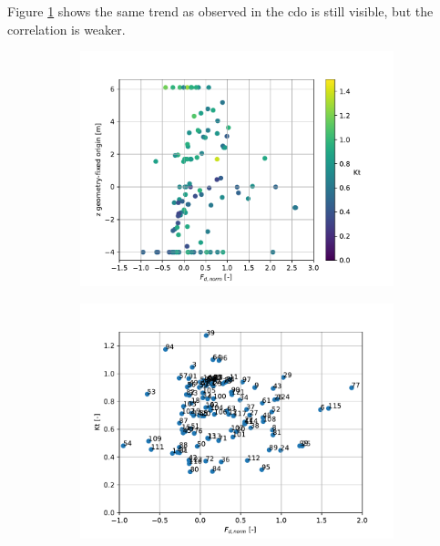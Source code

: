 Figure \ref{fig: Fd_norm_VS_top_bw_with_Kt} shows the same trend as observed in the \acrfull{cdo} is still visible, but the correlation is weaker. 

\begin{figure}[h]
    \centering
    \begin{subfigure}[b]{0.49\textwidth}
        \centering
        \includegraphics[width=\linewidth]{figures/ComFLOW/Results moving/DI1/H9/Fd_norm_VS_top_bw_with_Kt.pdf}
        \caption[]%
        {{\small }}    
        \label{fig: Fd_norm_VS_top_bw_with_Kt}
    \end{subfigure}
    \hfill
    \begin{subfigure}[b]{0.49\textwidth}  
        \centering 
        \includegraphics[width=\linewidth]{figures/ComFLOW/Results moving/DI1/H9/Fd_norm_VS_Kt.pdf}
        \caption[]%
        {{\small }}    
        \label{fig:  Fd_norm vs Kt}
    \end{subfigure}
    
    \caption{}
    \label{fig: }
\end{figure}



